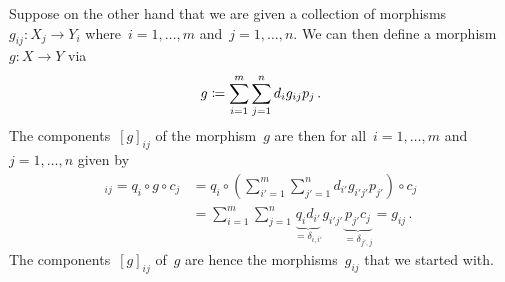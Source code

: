 \begin{remark*}
  Suppose on the other hand that we are given a collection of morphisms~$g_{ij} \colon X_j \to Y_i$ where~$i = 1, \dotsc, m$ and~$j = 1, \dotsc, n$.
  We can then define a morphism~$g \colon X \to Y$ via
  \[
              g
    \coloneqq  \sum_{i=1}^m \sum_{j=1}^n d_i g_{ij} p_j \,.
  \]
  The components~$[g]_{ij}$ of the morphism~$g$ are then for all~$i = 1, \dotsc, m$ and~$j = 1, \dotsc, n$ given by
  \begin{align*}
        [g]_{ij}
     =  q_i \circ g \circ c_j
    &=  q_i \circ \left( \sum_{i'=1}^m \sum_{j'=1}^n d_{i'} g_{i'j'} p_{j'} \right) \circ c_j \\
    &=  \sum_{i=1}^m \sum_{j=1}^n
        \underbrace{q_i d_{i'}}_{= \delta_{i,i'}} g_{i'j'} \underbrace{p_{j'} c_j}_{= \delta_{j',j}}
     =  g_{ij} \,.
  \end{align*}
  The components~$[g]_{ij}$ of~$g$ are hence the morphisms~$g_{ij}$ that we started with.
  

\end{remark*}
